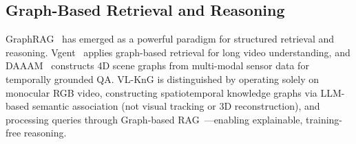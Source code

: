 \subsection{Graph-Based Retrieval and Reasoning}
GraphRAG~\cite{Han2024RetrievalAugmentedGW} has emerged as a powerful paradigm for structured retrieval and reasoning.
Vgent~\cite{vgent2025neurips} applies graph-based retrieval for long video understanding, and DAAAM~\cite{daaam2025arxiv} constructs 4D scene graphs from multi-modal sensor data for temporally grounded QA.
VL-KnG is distinguished by operating solely on monocular RGB video, constructing spatiotemporal knowledge graphs via LLM-based semantic association (not visual tracking or 3D reconstruction), and processing queries through Graph-based RAG~\cite{Han2024RetrievalAugmentedGW}---enabling explainable, training-free reasoning.
